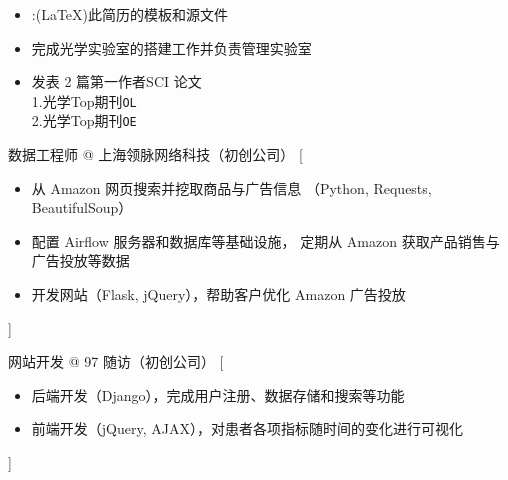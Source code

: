 \documentclass[zh]{resume}
\begin{document}
\begin{itemize}
  \item {}:(\LaTeX)此简历的模板和源文件
  \item 完成光学实验室的搭建工作并负责管理实验室
\end{itemize}

\begin{itemize}
  \item 发表 2 篇第一作者SCI 论文
  \\ 1.光学Top期刊\texttt{OL}\link{}{}
  \\ 2.光学Top期刊\texttt{OE}

\end{itemize}

\begin{experiences}
    {数据工程师 @ 上海领脉网络科技（初创公司）}%
    [\begin{itemize}
      \item 从 Amazon 网页搜索并挖取商品与广告信息
        （Python, Requests, BeautifulSoup）
      \item 配置 Airflow 服务器和数据库等基础设施，
        定期从 Amazon 获取产品销售与广告投放等数据
      \item 开发网站（Flask, jQuery），帮助客户优化 Amazon 广告投放
    \end{itemize}]

  \separator{0.5ex}
    {网站开发 @ 97 随访（初创公司）}%
    [\begin{itemize}
      \item 后端开发（Django），完成用户注册、数据存储和搜索等功能
      \item 前端开发（jQuery, AJAX），对患者各项指标随时间的变化进行可视化
    \end{itemize}]
\end{experiences}
\end{document}
